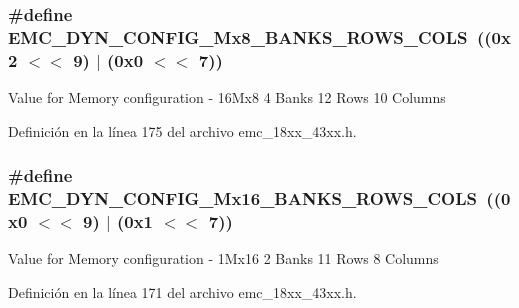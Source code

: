 \subsubsection[{\texorpdfstring{E\+M\+C\+\_\+\+D\+Y\+N\+\_\+\+C\+O\+N\+F\+I\+G\+\_\+16\+Mx8\+\_\+4\+B\+A\+N\+K\+S\+\_\+12\+R\+O\+W\+S\+\_\+10\+C\+O\+LS}{EMC_DYN_CONFIG_16Mx8_4BANKS_12ROWS_10COLS}}]{\setlength{\rightskip}{0pt plus 5cm}\#define E\+M\+C\+\_\+\+D\+Y\+N\+\_\+\+C\+O\+N\+F\+I\+G\+\_\+Mx8\+\_\+B\+A\+N\+K\+S\+\_\+R\+O\+W\+S\+\_\+C\+O\+LS~((0x2 $<$$<$ 9) $\vert$ (0x0 $<$$<$ 7))}\hypertarget{group___e_m_c__18_x_x__43_x_x_ga75312a857f7b6623919b516996e2a977}{}\label{group___e_m_c__18_x_x__43_x_x_ga75312a857f7b6623919b516996e2a977}
Value for Memory configuration -\/ 16\+Mx8 4 Banks 12 Rows 10 Columns 

Definición en la línea 175 del archivo emc\+\_\+18xx\+\_\+43xx.\+h.

\subsubsection[{\texorpdfstring{E\+M\+C\+\_\+\+D\+Y\+N\+\_\+\+C\+O\+N\+F\+I\+G\+\_\+1\+Mx16\+\_\+2\+B\+A\+N\+K\+S\+\_\+11\+R\+O\+W\+S\+\_\+8\+C\+O\+LS}{EMC_DYN_CONFIG_1Mx16_2BANKS_11ROWS_8COLS}}]{\setlength{\rightskip}{0pt plus 5cm}\#define E\+M\+C\+\_\+\+D\+Y\+N\+\_\+\+C\+O\+N\+F\+I\+G\+\_\+Mx16\+\_\+B\+A\+N\+K\+S\+\_\+R\+O\+W\+S\+\_\+C\+O\+LS~((0x0 $<$$<$ 9) $\vert$ (0x1 $<$$<$ 7))}\hypertarget{group___e_m_c__18_x_x__43_x_x_gaab6b50051ea4b8fca15c7c5faf05a3f6}{}\label{group___e_m_c__18_x_x__43_x_x_gaab6b50051ea4b8fca15c7c5faf05a3f6}
Value for Memory configuration -\/ 1\+Mx16 2 Banks 11 Rows 8 Columns 

Definición en la línea 171 del archivo emc\+\_\+18xx\+\_\+43xx.\+h.


